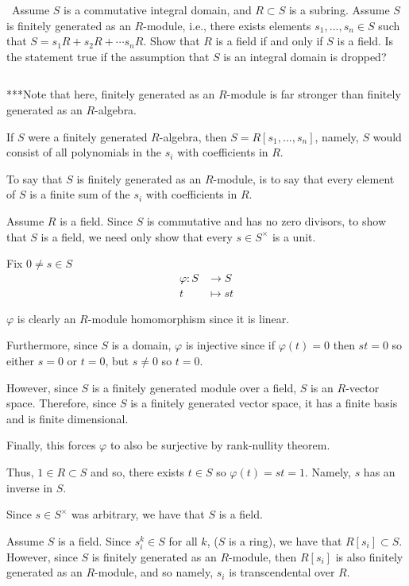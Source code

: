 \documentclass[12pt]{AlgebraQual}
\begin{document}
\begin{problem} $\,$
Assume $S$ is a commutative integral domain, and $R\subset S$ is a subring. Assume $S$ is finitely generated as an $R$-module, i.e., there exists elements $s_1,...,s_n\in S$ such that $S=s_1R+s_2R+\cdots s_nR$. Show that $R$ is a field if and only if $S$ is a field. Is the statement true if the assumption that $S$ is an integral domain is dropped?
\end{problem}


\begin{solution}$\,$
\begin{mybox}
***Note that here, finitely generated as an $R$-module is far stronger than finitely generated as an $R$-algebra.

If $S$ were a finitely generated $R$-algebra, then $S=R[s_1,...,s_n]$, namely, $S$ would consist of all polynomials in the $s_i$ with coefficients in $R$.

To say that $S$ is finitely generated as an $R$-module, is to say that every element of $S$ is a finite sum of the $s_i$ with coefficients in $R$.
\end{mybox}

\boxed{\implies} Assume $R$ is a field. Since $S$ is commutative and has no zero divisors, to show that $S$ is a field, we need only show that every $s\in S^\times$ is a unit.

Fix $0\not=s\in S$ \begin{align*}
    \varphi:S&\to S\\
    t&\mapsto st
\end{align*}

$\varphi$ is clearly an $R$-module homomorphism since it is linear.

Furthermore, since $S$ is a domain, $\varphi$ is injective since if $\varphi(t)=0$ then $st=0$ so either $s=0$ or $t=0$, but $s\not=0$ so $t=0$.

However, since $S$ is a finitely generated module over a field, $S$ is an $R$-vector space. Therefore, since $S$ is a finitely generated vector space, it has a finite basis and is finite dimensional.

Finally, this forces $\varphi$ to also be surjective by rank-nullity theorem.

Thus, $1\in R\subset S$ and so, there exists $t\in S$ so $\varphi(t)=st=1.$ Namely, $s$ has an inverse in $S.$

Since $s\in S^\times$ was arbitrary, we have that $S$ is a field.

\boxed{\impliedby} Assume $S$ is a field. Since $s_i^k\in S$ for all $k$, ($S$ is a ring), we have that $R[s_i]\subset S$. However, since $S$ is finitely generated as an $R$-module, then $R[s_i]$ is also finitely generated as an $R$-module, and so namely, $s_i$ is transcendental over $R$.


\end{solution}
\end{document}
